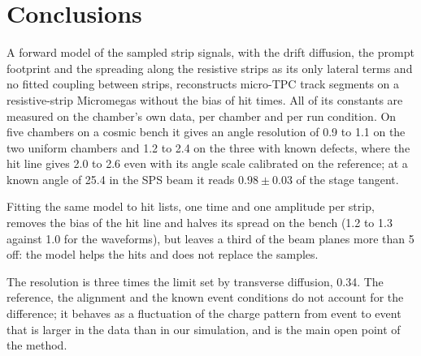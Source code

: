 \section{Conclusions}\label{sec:conclusions}
A forward model of the sampled strip signals, with the drift diffusion, the prompt footprint and the spreading along
the resistive strips as its only lateral terms and no fitted coupling between strips, reconstructs micro-TPC track
segments on a resistive-strip Micromegas without the bias of hit times. All of its constants are measured on the
chamber's own data, per chamber and per run condition. On five chambers on a cosmic bench it gives an angle
resolution of 0.9 to 1.1\textdegree{} on the two uniform chambers and 1.2 to 2.4\textdegree{} on the three with known
defects, where the hit line gives 2.0 to 2.6\textdegree{} even with its angle scale calibrated on the reference; at
a known angle of 25.4\textdegree{} in the SPS beam it reads $0.98\pm0.03$ of the stage tangent.

Fitting the same model to hit lists, one time and one amplitude per strip, removes the bias of the hit line and
halves its spread on the bench (1.2 to 1.3\textdegree{} against 1.0\textdegree{} for the waveforms), but leaves a
third of the beam planes more than 5\textdegree{} off: the model helps the hits and does not replace the samples.

The resolution is three times the limit set by transverse diffusion, 0.34\textdegree. The reference, the alignment
and the known event conditions do not account for the difference; it behaves as a fluctuation of the charge pattern
from event to event that is larger in the data than in our simulation, and is the main open point of the method.
